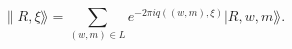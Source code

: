 \begin{equation}
\label{eq:bdystate}
  \lVert R, \xi \rAngle = \sum_{(w,m) \in L} e^{-2 \pi i q((w,m), \xi)}
  \lvert R, w,m \rAngle.
\end{equation}

